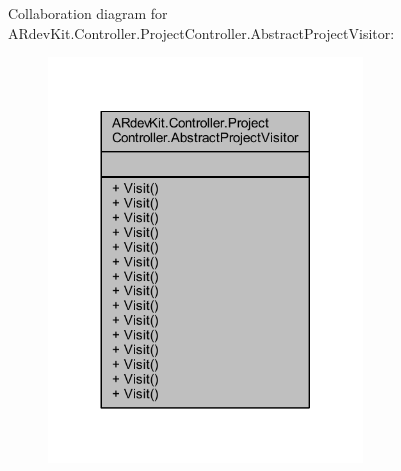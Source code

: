 Collaboration diagram for A\-Rdev\-Kit.\-Controller.\-Project\-Controller.\-Abstract\-Project\-Visitor\-:
\nopagebreak
\begin{figure}[H]
\begin{center}
\leavevmode
\includegraphics[width=236pt]{class_a_rdev_kit_1_1_controller_1_1_project_controller_1_1_abstract_project_visitor__coll__graph}
\end{center}
\end{figure}
